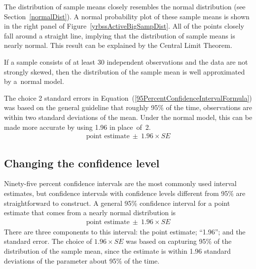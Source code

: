 \begin{spacing}{1.5}

The distribution of sample means closely resembles the normal distribution (see Section~\ref{normalDist}). A normal probability plot of these sample means is shown in the right panel of Figure~\ref{yrbssActiveBigSampDist}. All of the points closely fall around a straight line, implying that  the distribution of sample means is nearly normal. This result can be explained by the Central Limit Theorem.

\begin{termBox}{
If a sample consists of at least 30 independent observations and the data are not strongly skewed, then the distribution of the sample mean is well approximated by a~normal model.}
\end{termBox}


The choice 2 standard errors in Equation~(\ref{95PercentConfidenceIntervalFormula}) was based on the general guideline that roughly 95\% of the time, observations are within two standard deviations of the mean. Under the normal model, this can be made more accurate by using 1.96 in place~of~2.
\begin{eqnarray}
\text{point estimate}\ \pm\ 1.96\times SE
\label{95PercentCIWhenUsingNormalModel}
\end{eqnarray}


\subsection{Changing the confidence level}
\label{changingTheConfidenceLevelSection}


Ninety-five percent confidence intervals are the most commonly used interval estimates, but confidence intervals with confidence levels different from 95\% are straightforward to construct.  A general 95\% confidence interval for a point estimate that comes from a nearly normal distribution is 
\begin{eqnarray}
\text{point estimate}\ \pm\ 1.96\times SE
\end{eqnarray}
There are three components to this interval: the point estimate; ``1.96''; and the standard error. The choice of $1.96\times SE$ was based on capturing 95\% of the distribution of the sample mean,  since the estimate is within 1.96 standard deviations of the parameter about 95\% of the time. 


\end{spacing}
